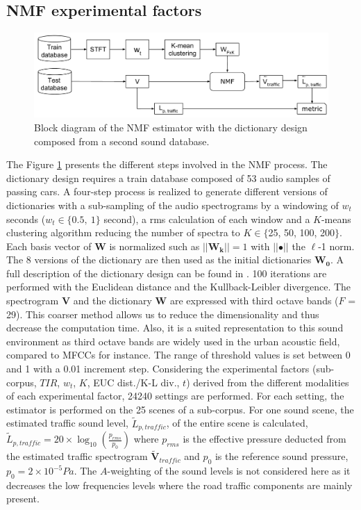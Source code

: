 \documentclass[12pt,english,twoside]{article}
\begin{document}
\subsection{NMF experimental factors}

\begin{figure}
    \centering
    \includegraphics[width=.7\linewidth]{./figures/bloc_diagram_complet_NMF_EN.pdf}
    \caption{Block diagram of the NMF estimator with the dictionary design composed from a second sound database.}
    \label{fig:bloc_nmf}
\end{figure}

The Figure \ref{fig:bloc_nmf} presents the different steps involved in the NMF process.
The dictionary design requires a train database composed of 53 audio samples of passing cars. A four-step process is realized to generate different versions of dictionaries with a sub-sampling of the audio spectrograms by a windowing of $w_t$ seconds ($w_t\in \lbrace 0.5,~1\rbrace$ second), a rms calculation of each window and a $K$-means clustering algorithm reducing the number of spectra to $K \in \lbrace$25, 50, 100, 200$\rbrace$. Each basis vector of $\mathbf{W}$ is normalized such as $\vert \vert \mathbf{W_k} \vert \vert = 1$ with $\vert \vert \bullet \vert\vert$ the $\ell$-1 norm. The 8 versions of the dictionary are then used as the initial dictionaries $\mathbf{W_0}$. A full description of the dictionary design can be found in \cite{gloaguen2019road}.
100 iterations are performed with the Euclidean distance and the Kullback-Leibler divergence. The spectrogram $\mathbf{V}$ and the dictionary $\mathbf{W}$ are expressed with third octave bands ($F$ = 29). This coarser method allows us to reduce the dimensionality and thus decrease the computation time. Also, it is a suited representation to this sound environment as third octave bands are widely used in the urban acoustic field, compared to MFCCs for instance. The range of threshold values is set between 0 and 1 with a 0.01 increment step. Considering the experimental factors (sub-corpus, $TIR$, $w_t$, $K$, EUC dist./K-L div., $t$) derived from the different modalities of each experimental factor, 24240 settings are performed. For each setting, the estimator is performed on the 25 scenes of a sub-corpus. For one sound scene, the estimated traffic sound level, $\tilde{L}_{p,traffic}$, of the entire scene is calculated, $\tilde{L}_{p,traffic} = 20 \times \log_{10}\left(\frac{p_{rms}}{p_0}\right)$ where $p_{rms}$ is the effective pressure deducted from the estimated traffic spectrogram $\mathbf{\tilde{V}}_{traffic}$ and $p_0$ is the reference sound pressure, $p_0 = 2 \times 10^{-5} Pa$.  The $A$-weighting of the sound levels is not considered here as it decreases the low frequencies levels where the road traffic components are mainly present.
\end{document}
